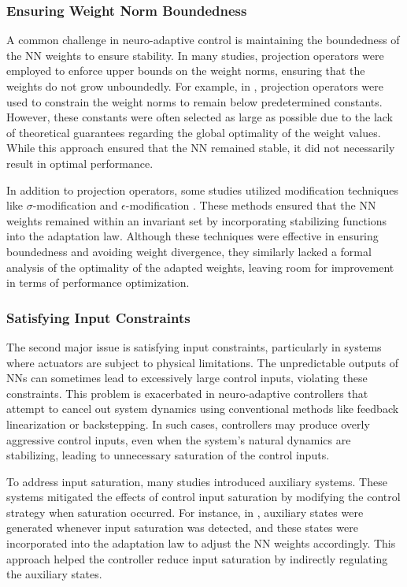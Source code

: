 \documentclass[lettersize,journal]{IEEEtran}
\begin{document}
\subsubsection{Ensuring Weight Norm Boundedness}

A common challenge in neuro-adaptive control is maintaining the boundedness of the NN weights to ensure stability. In many studies, projection operators were employed to enforce upper bounds on the weight norms, ensuring that the weights do not grow unboundedly. For example, in \cite{RN16, RN14, RN11}, projection operators were used to constrain the weight norms to remain below predetermined constants. However, these constants were often selected as large as possible due to the lack of theoretical guarantees regarding the global optimality of the weight values. While this approach ensured that the NN remained stable, it did not necessarily result in optimal performance.

In addition to projection operators, some studies utilized modification techniques like $\sigma$-modification \cite{RN10} and $\epsilon$-modification \cite{RN41, RN3}. These methods ensured that the NN weights remained within an invariant set by incorporating stabilizing functions into the adaptation law. Although these techniques were effective in ensuring boundedness and avoiding weight divergence, they similarly lacked a formal analysis of the optimality of the adapted weights, leaving room for improvement in terms of performance optimization.

\subsubsection{Satisfying Input Constraints}

The second major issue is satisfying input constraints, particularly in systems where actuators are subject to physical limitations. The unpredictable outputs of NNs can sometimes lead to excessively large control inputs, violating these constraints. This problem is exacerbated in neuro-adaptive controllers that attempt to cancel out system dynamics using conventional methods like feedback linearization or backstepping. In such cases, controllers may produce overly aggressive control inputs, even when the system's natural dynamics are stabilizing, leading to unnecessary saturation of the control inputs.

To address input saturation, many studies introduced auxiliary systems. These systems mitigated the effects of control input saturation by modifying the control strategy when saturation occurred. For instance, in \cite{RN55, RN56, RN3}, auxiliary states were generated whenever input saturation was detected, and these states were incorporated into the adaptation law to adjust the NN weights accordingly. This approach helped the controller reduce input saturation by indirectly regulating the auxiliary states.
\end{document}
